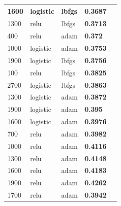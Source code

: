 \documentclass[conference]{IEEEtran}
\begin{document}
\begin{center}
\begin{tabular}{| l | l | l | l | l |}
1600                    & logistic               & lbfgs                  & \textbf{0.3687}        &                 \\ \hline
1300                    & relu                   & lbfgs                  & \textbf{0.3713}        &                 \\ \hline
400                     & relu                   & adam                   & \textbf{0.372}           &                 \\ \hline
1000                    & logistic               & adam                   & \textbf{0.3753}        &                 \\ \hline
1900                    & logistic               & lbfgs                  & \textbf{0.3756}        &                 \\ \hline
100                     & relu                   & lbfgs                  & \textbf{0.3825}        &                 \\ \hline
2700                    & logistic               & lbfgs                   & \textbf{0.3863}        &                 \\ \hline
1300                    & logistic               & adam                   & \textbf{0.3872}        &                 \\ \hline
1900                    & logistic               & adam                   & \textbf{0.395}           &                 \\ \hline
1600                    & logistic               & adam                   & \textbf{0.3976}        &                 \\ \hline
700                     & relu                   & adam                   & \textbf{0.3982}        &                 \\ \hline
1000                    & relu                   & adam                   & \textbf{0.4116}        &                 \\ \hline
1300                    & relu                   & adam                   & \textbf{0.4148}        &                 \\ \hline
1600                    & relu                   & adam                   & \textbf{0.4183}        &                 \\ \hline
1900                    & relu                   & adam                   & \textbf{0.4262}        &                 \\ \hline
1700                    & relu                   & adam                   & \textbf{0.3942}        &                 \\ \hline

\end{tabular}
\end{center}
\end{document}
